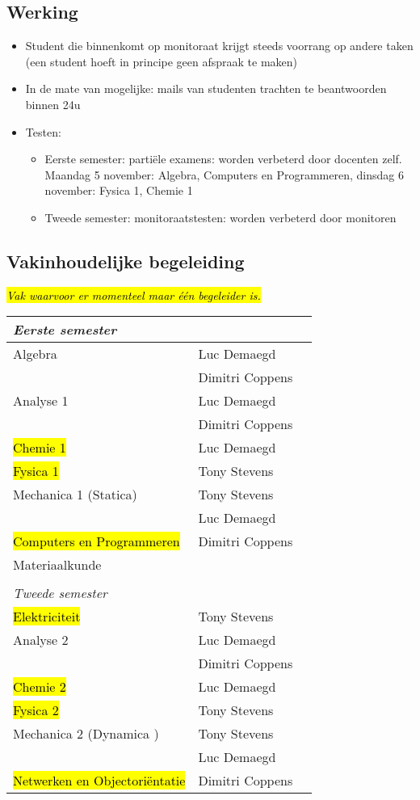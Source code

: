 \subsection{Werking}
\begin{itemize}
	\item Student die binnenkomt op monitoraat krijgt steeds voorrang op andere taken (een student hoeft in principe geen afspraak te maken)
	\item In de mate van mogelijke: mails van studenten trachten te beantwoorden binnen 24u
	\item Testen: \begin{itemize}
		\item Eerste semester: partiële examens:  worden verbeterd door docenten zelf. Maandag 5 november: Algebra, Computers en Programmeren, dinsdag 6 november: Fysica 1, Chemie 1
		\item Tweede semester: monitoraatstesten: worden verbeterd door monitoren		
	\end{itemize}\end{itemize}
\subsection{Vakinhoudelijke begeleiding}
\emph{\hl{Vak waarvoor er momenteel maar \'e\'en begeleider is.}}
\begin{table}[H]\footnotesize
	\centering	
	\begin{tabular}{ lll}	
		\emph{Eerste semester} &  \\ 
		\hline
		Algebra & Luc Demaegd \\
		& Dimitri Coppens \\
		Analyse 1 & Luc Demaegd \\
		& Dimitri Coppens \\
		\hl{Chemie 1} & Luc Demaegd\\
		\hl{Fysica 1}& Tony Stevens   \\
		Mechanica 1 (Statica)& Tony Stevens\\
		& Luc Demaegd\\
		\hl{Computers en Programmeren}& Dimitri Coppens \\
		Materiaalkunde & \\
		\\
		 
		 \emph{Tweede semester}\\
		\hline
		\hl{Elektriciteit} & Tony Stevens \\
		Analyse 2 & Luc Demaegd \\
& Dimitri Coppens \\
\hl{Chemie 2} & Luc Demaegd\\
\hl{Fysica 2}& Tony Stevens   \\
Mechanica 2 (Dynamica )& Tony Stevens\\
& Luc Demaegd\\
\hl{Netwerken en Objectori\"entatie} & Dimitri Coppens 
		\end{tabular}
\end{table}



